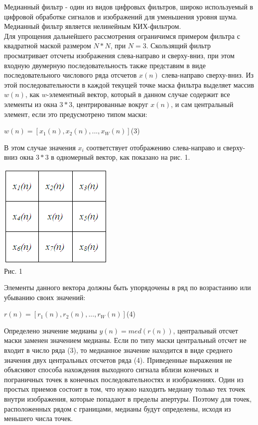 \documentclass[russian,a4paper,12pt]{scrartcl}
\begin{document}
			Медианный фильтр - один из видов цифровых фильтров, широко используемый в цифровой обработке сигналов и изображений для уменьшения уровня шума. Медианный фильтр является нелинейным КИХ-фильтром.\\
			Для упрощения дальнейшего рассмотрения ограничимся примером фильтра с квадратной маской размером $N*N$, при $N=3$. Скользящий фильтр просматривает отсчеты изображения слева-направо и сверху-вниз, при этом входную двумерную последовательность также представим в виде последовательного числового ряда отсчетов ${x(n)}$ слева-направо сверху-вниз. Из этой последовательности в каждой текущей точке маска фильтра выделяет массив $w(n)$, как $w$-элементный вектор, который в данном случае содержит все элементы из окна $3*3$, центрированные вокруг $x(n)$, и сам центральный элемент, если это предусмотрено типом маски:
			\begin{center}
			$w(n)=[x_1(n),x_2(n),...,x_W(n)]$(3)
			\end{center}
			В этом случае значения $x_i$
			соответствует отображению слева-направо и сверху-вниз окна $3*3$
			в одномерный вектор, как показано на рис. 1.\\
			\begin{center}
			\includegraphics[scale=0.8]{matrix}\\ Рис. 1
			\end{center}
			Элементы данного вектора должны быть упорядочены в ряд по возрастанию или убыванию своих значений:
			\begin{center}
			$r(n)=[r_1(n),r_2(n),...,r_W(n)]$(4)
			\end{center}
			Определено значение медианы $y(n)=med(r(n))$, центральный отсчет маски заменен значением медианы. Если по типу маски центральный отсчет не входит в число ряда (3), то медианное значение находится в виде среднего значения двух центральных отсчетов ряда (4).
			Приведенные выражения не объясняют способа нахождения выходного сигнала вблизи конечных и пограничных точек в конечных последовательностях и изображениях. Один из простых приемов состоит в том, что нужно находить медиану только тех точек внутри изображения, которые попадают в пределы апертуры. Поэтому для точек, расположенных рядом с границами, медианы будут определены, исходя из меньшего числа точек. 
\end{document}
